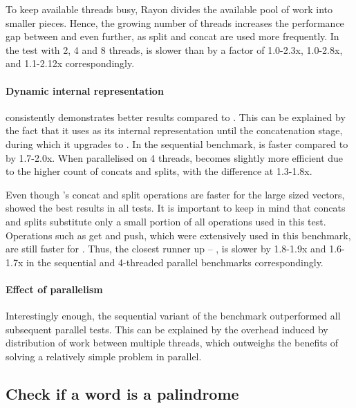 To keep available threads busy, Rayon divides the available pool of work into smaller pieces. Hence, the growing number of threads increases the performance gap between \rbvec{} and \rrbvec{} even further, as split and concat are used more frequently. In the test with 2, 4 and 8 threads, \rbvec{} is slower than \rrbvec{} by a factor of 1.0-2.3x, 1.0-2.8x, and 1.1-2.12x correspondingly. 

\paragraph{Dynamic internal representation}
\pvec{} consistently demonstrates better results compared to \rrbvec{}. This can be explained by the fact that it uses \stdvec{} as its internal representation until the concatenation stage, during which it upgrades to \rrbvec{}. In the sequential benchmark, \pvec{} is faster compared to \rrbvec{} by 1.7-2.0x. When parallelised on 4 threads, \rrbvec{} becomes slightly more efficient due to the higher count of concats and splits, with the difference at 1.3-1.8x. 

Even though \rrbvec{}'s concat and split operations are faster for the large sized vectors, \stdvec{} showed the best results in all tests. It is important to keep in mind that concats and splits substitute only a small portion of all operations used in this test. Operations such as get and push, which were extensively used in this benchmark, are still faster for \stdvec{}. Thus, the closest runner up -- \pvec{}, is slower by 1.8-1.9x and 1.6-1.7x in the sequential and 4-threaded parallel benchmarks correspondingly. 

\paragraph{Effect of parallelism}
Interestingly enough, the sequential variant of the benchmark outperformed all subsequent parallel tests. This can be explained by the overhead induced by distribution of work between multiple threads, which outweighs the benefits of solving a relatively simple problem in parallel.

\subsection{Check if a word is a palindrome}

